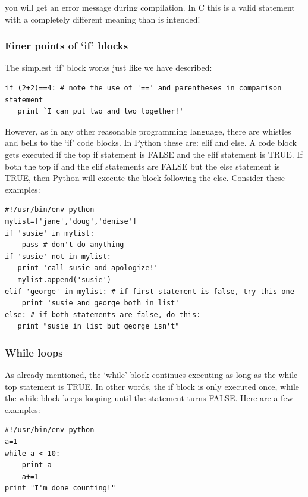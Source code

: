 \documentclass[11pt]{book}
\begin{document}
{{{\noindent you will get an error message during compilation.  In C this
is a valid statement with a completely different meaning
than is intended!  


\subsubsection{Finer points of `if' blocks}

The simplest `if' block works just like we have described:
{ \color{blue} \begin{verbatim}
if (2+2)==4: # note the use of '==' and parentheses in comparison statement
   print `I can put two and two together!'
\end{verbatim}}

However, as in  any other reasonable programming language, there are whistles and bells to the `if' code blocks.  In Python these are:  {\color{blue}elif} and {\color{blue}else}.  
A code block gets executed if the top {\color{blue}if} statement is FALSE and the  {\color{blue}elif}  statement is TRUE.  If both the top {\color{blue}if} and the {\color{blue}elif}  statements are FALSE but the  {\color{blue}else}  statement is TRUE, then Python will execute the block following the  {\color{blue}else}.  Consider these examples:

{ \color{blue} \begin{verbatim}
#!/usr/bin/env python
mylist=['jane','doug','denise']
if 'susie' in mylist:
    pass # don't do anything
if 'susie' not in mylist:
   print 'call susie and apologize!'
   mylist.append('susie')
elif 'george' in mylist: # if first statement is false, try this one
    print 'susie and george both in list' 
else: # if both statements are false, do this:
   print "susie in list but george isn't"
\end{verbatim}}

\subsubsection{While loops}

As already mentioned, the `while' block  continues executing as long as the {\color{blue}while}  top statement is TRUE.  In other words, the if block is only executed once, while the {\color{blue}while}  block keeps looping until the statement turns FALSE.    Here are a few examples:


{ \color{blue} \begin{verbatim}
#!/usr/bin/env python
a=1
while a < 10:
    print a
    a+=1
print "I'm done counting!"
\end{verbatim}}

}}}
\end{document}
